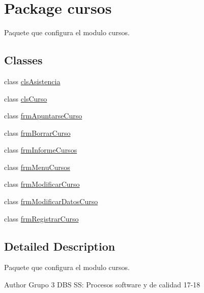 \hypertarget{namespacecursos}{}\section{Package cursos}
\label{namespacecursos}


Paquete que configura el modulo cursos.  


\subsection*{Classes}
\begin{DoxyCompactItemize}
\item 
class \hyperlink{classcursos_1_1cls_asistencia}{cls\+Asistencia}
\item 
class \hyperlink{classcursos_1_1cls_curso}{cls\+Curso}
\item 
class \hyperlink{classcursos_1_1frm_apuntarse_curso}{frm\+Apuntarse\+Curso}
\item 
class \hyperlink{classcursos_1_1frm_borrar_curso}{frm\+Borrar\+Curso}
\item 
class \hyperlink{classcursos_1_1frm_informe_cursos}{frm\+Informe\+Cursos}
\item 
class \hyperlink{classcursos_1_1frm_menu_cursos}{frm\+Menu\+Cursos}
\item 
class \hyperlink{classcursos_1_1frm_modificar_curso}{frm\+Modificar\+Curso}
\item 
class \hyperlink{classcursos_1_1frm_modificar_datos_curso}{frm\+Modificar\+Datos\+Curso}
\item 
class \hyperlink{classcursos_1_1frm_registrar_curso}{frm\+Registrar\+Curso}
\end{DoxyCompactItemize}


\subsection{Detailed Description}
Paquete que configura el modulo cursos. 

\begin{DoxyAuthor}{Author}
Grupo 3 D\+BS SS\+: Procesos software y de calidad 17-\/18 
\end{DoxyAuthor}
